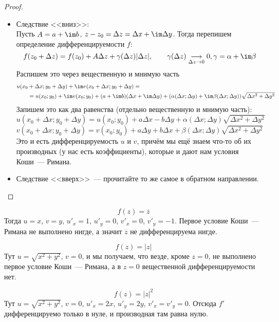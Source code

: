 \documentclass{article}
\begin{document}
    \begin{proof}
        \begin{itemize}
            \item Следствие <<вниз>>:\\
            Пусть $A=a+\im b$, $z-z_0=\Delta z=\Delta x+\im\Delta y$. Тогда перепишем определение дифференцируемости $f$:
            $$
            f(z_0+\Delta z)=f(z_0)+A\Delta z+\gamma(\Delta z)|\Delta z|,\qquad\gamma(\Delta z)\underset{\Delta z\to0}\longrightarrow0,\gamma=\alpha+\im\beta
            $$
            Распишем это через вещественную и мнимую часть
            \[\begin{split}
                u(x_0&+\Delta x;y_0+\Delta y)+\im v(x_0+\Delta x;y_0+\Delta y)=\\
                &=u(x_0;y_0)+\im v(x_0;y_0)+(a+\im b)(\Delta x+\im\Delta y)+(\alpha(\Delta x;\Delta y)+\im\beta(\Delta x;\Delta y))\sqrt{\Delta x^2+\Delta y^2}
            \end{split}\]
            Запишем это как два равенства (отдельно вещественную и мнимую часть):
            $$
            u(x_0+\Delta x;y_0+\Delta y)=u(x_0;y_0)+a\Delta x-b\Delta y+\alpha(\Delta x;\Delta y)\sqrt{\Delta x^2+\Delta y^2}
            $$
            $$
            v(x_0+\Delta x;y_0+\Delta y)=v(x_0;y_0)+a\Delta y+b\Delta x+\beta(\Delta x;\Delta y)\sqrt{\Delta x^2+\Delta y^2}
            $$
            Это и есть дифференцируемость $u$ и $v$, причём мы ещё знаем что-то об их производных (у нас есть коэффициенты), которые и дают нам условия Коши~--- Римана.
            \item Следствие <<вверх>>~--- прочитайте то же самое в обратном направлении.
        \end{itemize}
    \end{proof}
    \begin{example}
        $$f(z)=\overline z$$
        Тогда $u=x$, $v=y$, $u'_x=1$, $u'_y=0$, $v'_x=0$, $v'_y=-1$. Первое условие Коши~--- Римана не выполнено нигде, а значит $\overline z$ не дифференцируема нигде.
    \end{example}
    \begin{example}
        $$f(z)=|z|$$
        Тут $u=\sqrt{x^2+y^2}$, $v=0$, и мы получаем, что везде, кроме $z=0$, не выполнено первое условие Коши~--- Римана, а в $z=0$ вещественной дифференцируемости нет.
    \end{example}
    \begin{example}
        $$f(z)=|z|^2$$
        Тут $u=\sqrt{x^2+y^2}$, $v=0$, $u'_x=2x$, $u'_y=2y$, $v'_x=v'_y=0$. Отсюда $f'$ дифференцируемо только в нуле, и производная там равна нулю.
    \end{example}
\end{document}
